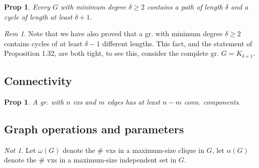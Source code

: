 \documentclass[11pt, fleqn, a4paper, landscape]{article}
\theoremstyle{plain} %
\newtheorem{pro}[thm]{Prop}
\theoremstyle{remark} %
\newtheorem{rem}[thm]{Rem}
\newtheorem{nota}[thm]{Not}
\theoremstyle{definition} %
\newtheorem{defi}[thm]{Def}
\begin{document}
\begin{multicols}{5}
\begin{pro}
Every $G$ with minimum degree $ \delta\ge 2$ contains a path of length $\delta$ and a cycle of length at least $\delta + 1$.
\end{pro}

\begin{rem}
Note that we have also proved that a gr. with minimum degree $\delta\ge 2$ contains cycles of at least $\delta-1$ different lengths. This fact, and the statement of Proposition 1.32, are both tight, to see this, consider the complete gr. $G = K_{\delta+1}$.
\end{rem} 

\subsection{Connectivity}

\addtocounter{thm}{2}
\addtocounter{thm}{2}
\begin{pro}
A gr. with $n$ vxs and $m$ edges has at least $n-m$ conn. components.
\end{pro}

\subsection{Graph operations and parameters}

\addtocounter{thm}{2}
\addtocounter{thm}{2}
\begin{nota}
Let $\omega(G)$ denote the \# vxs in a maximum-size clique in $G$, let $\alpha(G)$ denote the \# vxs in a maximum-size independent set in $G$.
\end{nota}


\end{multicols}
\end{document}
